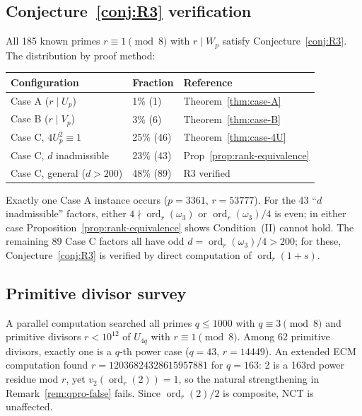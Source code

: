 \documentclass[12pt]{article}
\theoremstyle{plain}
\theoremstyle{definition}
\theoremstyle{remark}
\begin{document}
\subsection{Conjecture~\ref{conj:R3} verification}


All 185 known primes \(r \equiv 1 \pmod{8}\) with \(r \mid W_p\)
satisfy Conjecture~\ref{conj:R3}. The distribution by proof method:

\begin{center}
\begin{tabular}{lll}
\hline
Configuration & Fraction & Reference \\
\hline
Case A (\(r \mid U_p\)) & 1\% (1) & Theorem~\ref{thm:case-A} \\
Case B (\(r \mid V_p\)) & 3\% (6) & Theorem~\ref{thm:case-B} \\
Case C, \(4U_p^2 \equiv 1\) & 25\% (46) & Theorem~\ref{thm:case-4U} \\
Case C, \(d\) inadmissible & 23\% (43) & Prop~\ref{prop:rank-equivalence} \\
Case C, general (\(d > 200\)) & 48\% (89) & R3 verified \\
\hline
\end{tabular}
\end{center}


Exactly one Case A instance occurs (\(p = 3361\), \(r = 53777\)).
For the 43 ``\(d\) inadmissible'' factors, either
\(4 \nmid \operatorname{ord}_r(\omega_3)\) or
\(\operatorname{ord}_r(\omega_3)/4\) is even; in either case
Proposition~\ref{prop:rank-equivalence} shows Condition~(II) cannot hold.
The remaining 89 Case C factors all have odd
\(d = \operatorname{ord}_r(\omega_3)/4 > 200\); for these,
Conjecture~\ref{conj:R3} is verified by direct computation of
\(\operatorname{ord}_r(1+s)\).

\subsection{Primitive divisor survey}


A parallel computation searched all primes \(q \leq 1000\) with
\(q \equiv 3 \pmod{8}\) and primitive divisors \(r < 10^{12}\) of
\(U_{4q}\) with \(r \equiv 1 \pmod{8}\). Among 62 primitive divisors,
exactly one is a \(q\)-th power case (\(q = 43\), \(r = 14449\)).
An extended ECM computation found
\(r = 12036824328615957881\) for \(q = 163\): 2 is a 163rd power
residue mod \(r\), yet \(v_2(\operatorname{ord}_r(2)) = 1\), so
the natural strengthening in Remark~\ref{rem:qpro-false} fails. Since
\(\operatorname{ord}_r(2)/2\) is composite, NCT is unaffected.
\end{document}
